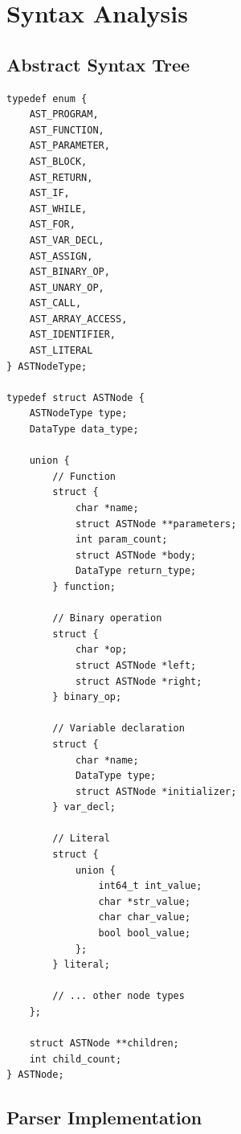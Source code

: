 \documentclass[12pt,a4paper,oneside]{book}
\begin{document}
\chapter{Syntax Analysis}

\section{Abstract Syntax Tree}

\begin{lstlisting}[style=c, caption={AST Node Types}]
typedef enum {
    AST_PROGRAM,
    AST_FUNCTION,
    AST_PARAMETER,
    AST_BLOCK,
    AST_RETURN,
    AST_IF,
    AST_WHILE,
    AST_FOR,
    AST_VAR_DECL,
    AST_ASSIGN,
    AST_BINARY_OP,
    AST_UNARY_OP,
    AST_CALL,
    AST_ARRAY_ACCESS,
    AST_IDENTIFIER,
    AST_LITERAL
} ASTNodeType;

typedef struct ASTNode {
    ASTNodeType type;
    DataType data_type;
    
    union {
        // Function
        struct {
            char *name;
            struct ASTNode **parameters;
            int param_count;
            struct ASTNode *body;
            DataType return_type;
        } function;
        
        // Binary operation
        struct {
            char *op;
            struct ASTNode *left;
            struct ASTNode *right;
        } binary_op;
        
        // Variable declaration
        struct {
            char *name;
            DataType type;
            struct ASTNode *initializer;
        } var_decl;
        
        // Literal
        struct {
            union {
                int64_t int_value;
                char *str_value;
                char char_value;
                bool bool_value;
            };
        } literal;
        
        // ... other node types
    };
    
    struct ASTNode **children;
    int child_count;
} ASTNode;
\end{lstlisting}

\section{Parser Implementation}
\end{document}

